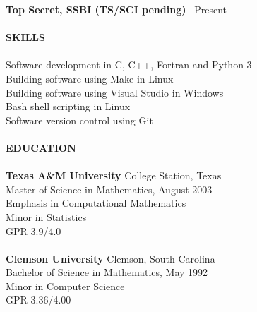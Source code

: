 \documentclass{article}
\begin{document}
\begin{tabbing}
\>\textbf{Top Secret, SSBI (TS/SCI pending)}          --Present         \\
                                                                              \\
\textbf{SKILLS}                                                               \\
                                                                              \\
\>Software development in C, C++, Fortran and Python 3                        \\
\>Building software using Make in Linux                                       \\
\>Building software using Visual Studio in Windows                            \\
\>Bash shell scripting in Linux                                               \\
\>Software version control using Git                                          \\
                                                                              \\
\textbf{EDUCATION}                                                            \\
                                                                              \\
\>\textbf{Texas A\&M University}                      \>College Station, Texas\\
\>Master of Science in Mathematics,                   \>August 2003           \\
\>Emphasis in Computational Mathematics                                       \\
\>Minor in Statistics                                                         \\
\>GPR 3.9/4.0                                                                 \\
                                                                              \\
\>\textbf{Clemson University}                         \>Clemson, South Carolina\\
\>Bachelor of Science in Mathematics,                 \>May 1992              \\
\>Minor in Computer Science                                                   \\
\>GPR 3.36/4.00                                                               \\

\end{tabbing}
\end{document}
